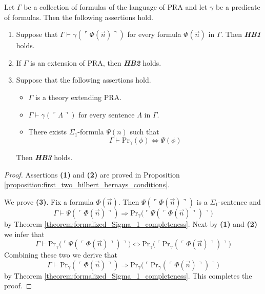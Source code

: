 \documentclass[10pt]{amsart}
\newcommand{\godel}[1]{\ulcorner #1 \urcorner}
\newcommand{\mra}{\boldsymbol{\Rightarrow}}
\newcommand{\mequiv}{\boldsymbol{\Leftrightarrow}}
\begin{document}
\begin{corollary}\label{corollary:hilbert_bernays_conditions}
	Let $\Gamma$ be a collection of formulas of the language of $\mathrm{PRA}$ and let $\gamma$ be a predicate of formulas. Then the following assertions hold.
	\begin{enumerate}[label=\emph{\textbf{(\arabic*)}}, leftmargin=3.0em]
    \item Suppose that $\Gamma \vdash \gamma\left(\godel{\Phi(\vec{n})}\right)$ for every formula $\Phi(\vec{n})$ in $\Gamma$. Then \emph{\textbf{HB1}} holds.
    \item If $\Gamma$ is an extension of $\mathrm{PRA}$, then \emph{\textbf{HB2}} holds. 
    \item Suppose that the following assertions hold.
      \begin{itemize}
        \item[] $\Gamma$ is a theory extending $\mathrm{PRA}$.
        \item[] $\Gamma \vdash \gamma\left(\godel{\Lambda}\right)$ for every sentence $\Lambda$ in $\Gamma$.
        \item[] There exists $\Sigma_1$-formula $\Psi(n)$ such that 
      $$\Gamma \vdash \mathrm{Pr}_{\gamma}(\phi) \mequiv \Psi(\phi)$$
          \end{itemize}
      Then \emph{\textbf{HB3}} holds.
  \end{enumerate}
\end{corollary}
\begin{proof}
  Assertions \textbf{(1)} and \textbf{(2)} are proved in Proposition \ref{proposition:first_two_hilbert_bernays_conditions}.

  We prove \textbf{(3)}. Fix a formula $\Phi(\vec{n})$. Then $\Psi(\godel{\Phi(\vec{n})})$ is a $\Sigma_1$-sentence and 
  $$\Gamma \vdash \Psi\left(\godel{\Phi(\vec{n})}\right) \mra \mathrm{Pr}_{\gamma}\bigg(\godel{\Psi(\godel{\Phi(\vec{n})})}\bigg)$$
  by Theorem \ref{theorem:formalized_Sigma_1_completeness}. Next by \textbf{(1)} and \textbf{(2)} we infer that
  $$\Gamma \vdash \mathrm{Pr}_{\gamma}\big(\godel{\Psi(\godel{\Phi(\vec{n})})}\big) \mequiv \mathrm{Pr}_{\gamma}\bigg(\godel{\mathrm{Pr}_{\gamma}(\godel{\Phi(\vec{n})})}\bigg)$$
  Combining these two we derive that
$$\Gamma \vdash \mathrm{Pr}_{\gamma}\left(\godel{\Phi(\vec{n})}\right) \mra \mathrm{Pr}_{\gamma}\bigg(\godel{\mathrm{Pr}_{\gamma}(\godel{\Phi(\vec{n})})}\bigg)$$
by Theorem \ref{theorem:formalized_Sigma_1_completeness}. This completes the proof.
\end{proof}
\end{document}
